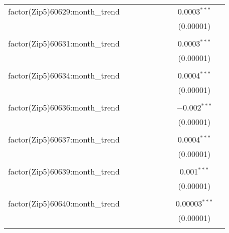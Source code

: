\begin{table}[H]
{\begin{tabular}{@{\extracolsep{5pt}}lcccccccc}
  factor(Zip5)60629:month\_trend &  &  &  &  &  &  & 0.0003$^{***}$ &  \\  

   &  &  &  &  &  &  & (0.00001) &  \\  

   & & & & & & & & \\  

  factor(Zip5)60631:month\_trend &  &  &  &  &  &  & 0.0003$^{***}$ &  \\  

   &  &  &  &  &  &  & (0.00001) &  \\  

   & & & & & & & & \\  

  factor(Zip5)60634:month\_trend &  &  &  &  &  &  & 0.0004$^{***}$ &  \\  

   &  &  &  &  &  &  & (0.00001) &  \\  

   & & & & & & & & \\  

  factor(Zip5)60636:month\_trend &  &  &  &  &  &  & $-$0.002$^{***}$ &  \\  

   &  &  &  &  &  &  & (0.00001) &  \\  

   & & & & & & & & \\  

  factor(Zip5)60637:month\_trend &  &  &  &  &  &  & 0.0004$^{***}$ &  \\  

   &  &  &  &  &  &  & (0.00001) &  \\  

   & & & & & & & & \\  

  factor(Zip5)60639:month\_trend &  &  &  &  &  &  & 0.001$^{***}$ &  \\  

   &  &  &  &  &  &  & (0.00001) &  \\  

   & & & & & & & & \\  

  factor(Zip5)60640:month\_trend &  &  &  &  &  &  & 0.00003$^{***}$ &  \\  

   &  &  &  &  &  &  & (0.00001) &  \\  

   & & & & & & & & \\  


\end{tabular}}
\end{table}
